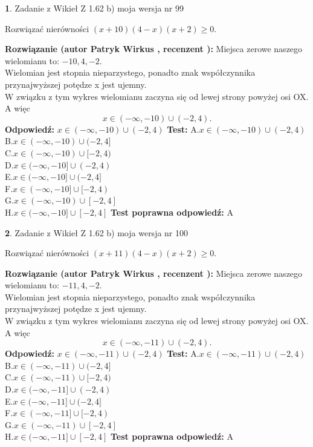 \documentclass[12pt, a4paper]{article}
\theoremstyle{definition} %
\newtheorem{zad}{}
\newcommand{\zadStart}[1]{\begin{zad}#1\newline}
\newcommand{\zadStop}{\end{zad}}
\newcommand{\rozwStart}[2]{\noindent \textbf{Rozwiązanie (autor #1 , recenzent #2): }\newline}
\newcommand{\rozwStop}{\newline}
\newcommand{\odpStart}{\noindent \textbf{Odpowiedź:}\newline}
\newcommand{\odpStop}{\newline}
\newcommand{\testStart}{\noindent \textbf{Test:}\newline}
\newcommand{\testStop}{\newline}
\newcommand{\kluczStart}{\noindent \textbf{Test poprawna odpowiedź:}\newline}
\newcommand{\kluczStop}{\newline}
\begin{document}
\zadStart{Zadanie z Wikieł Z 1.62 b) moja wersja nr 99}

Rozwiązać nierówności $(x+10)(4-x)(x+2)\ge0$.
\zadStop
\rozwStart{Patryk Wirkus}{}
Miejsca zerowe naszego wielomianu to: $-10, 4, -2$.\\
Wielomian jest stopnia nieparzystego, ponadto znak współczynnika przy\linebreak najwyższej potędze x jest ujemny.\\ W związku z tym wykres wielomianu zaczyna się od lewej strony powyżej osi OX. A więc $$x \in (-\infty,-10) \cup (-2,4).$$
\rozwStop
\odpStart
$x \in (-\infty,-10) \cup (-2,4)$
\odpStop
\testStart
A.$x \in (-\infty,-10) \cup (-2,4)$\\
B.$x \in (-\infty,-10) \cup (-2,4]$\\
C.$x \in (-\infty,-10) \cup [-2,4)$\\
D.$x \in (-\infty,-10] \cup (-2,4)$\\
E.$x \in (-\infty,-10] \cup (-2,4]$\\
F.$x \in (-\infty,-10] \cup [-2,4)$\\
G.$x \in (-\infty,-10) \cup [-2,4]$\\
H.$x \in (-\infty,-10] \cup [-2,4]$
\testStop
\kluczStart
A
\kluczStop



\zadStart{Zadanie z Wikieł Z 1.62 b) moja wersja nr 100}

Rozwiązać nierówności $(x+11)(4-x)(x+2)\ge0$.
\zadStop
\rozwStart{Patryk Wirkus}{}
Miejsca zerowe naszego wielomianu to: $-11, 4, -2$.\\
Wielomian jest stopnia nieparzystego, ponadto znak współczynnika przy\linebreak najwyższej potędze x jest ujemny.\\ W związku z tym wykres wielomianu zaczyna się od lewej strony powyżej osi OX. A więc $$x \in (-\infty,-11) \cup (-2,4).$$
\rozwStop
\odpStart
$x \in (-\infty,-11) \cup (-2,4)$
\odpStop
\testStart
A.$x \in (-\infty,-11) \cup (-2,4)$\\
B.$x \in (-\infty,-11) \cup (-2,4]$\\
C.$x \in (-\infty,-11) \cup [-2,4)$\\
D.$x \in (-\infty,-11] \cup (-2,4)$\\
E.$x \in (-\infty,-11] \cup (-2,4]$\\
F.$x \in (-\infty,-11] \cup [-2,4)$\\
G.$x \in (-\infty,-11) \cup [-2,4]$\\
H.$x \in (-\infty,-11] \cup [-2,4]$
\testStop
\kluczStart
A
\kluczStop
\end{document}

